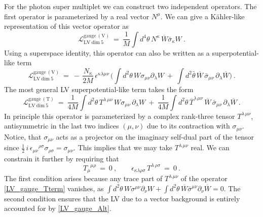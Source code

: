 \documentclass[12pt]{revtex4}
\begin{document}
For the photon super multiplet we can construct two independent
operators. The first operator is parameterized by a real vector
$N^\mu$. We can give a K\"ahler-like representation of this vector
operator as  
\begin{equation}
\label{LV_gauge}
\mathcal{L}_{\mathrm{LV\ dim\ 5}}^{\mathrm{gauge\ (V)}} ~=~ 
\frac 1M \int d^4\theta \, 
N^\kappa\, \overline{W} \bar{\sigma}_\kappa W~.   
\end{equation}
%
Using a superspace identity, this operator can also be written as a
superpotential-like term  
%
\begin{equation}
\label{LV_gauge_Alt}
\mathcal{L}_{\mathrm{LV\ dim\ 5}}^{\mathrm{gauge\ (V)}} ~=~ 
- \, \frac {N_\kappa}{2 M}\,  \epsilon^{\kappa\lambda\mu\nu} \,  
\Big( 
\int d^2\theta\, W \sigma_{\mu\nu} \partial_\lambda W ~+~
\int d^2\bar{\theta}\, \overline{W} \, \bar{\sigma}_{\mu\nu}\, 
\partial_\lambda \overline{W} 
\Big)~.
\end{equation} 
%
The most general LV superpotential-like term takes the form 
\begin{equation}
\label{LV_gauge_Tterm}
\mathcal{L}_{\mathrm{LV\ dim\ 5}}^{\mathrm{gauge\ (T)}} ~=~ 
\frac 1{4M} 
\int d^2\theta \, T^{\lambda\, \mu\nu} \,
        W \sigma_{\mu\nu} \, \partial_\lambda W  
~+~ \frac 1{4M} 
\int d^2\theta \, \overline{T}^{\lambda\, \mu\nu} \,
        \overline{W} \,\bar{\sigma}_{\mu\nu}\, \partial_\lambda\overline{W}  
~.
\end{equation}
%
In principle this operator is parameterized by a complex rank-three
tensor $T^{\lambda\,\mu\nu}$, antisymmetric in the last two indices
$(\mu,\nu)$ due to its contraction with $\sigma_{\mu\nu}$. Notice, that
$\sigma_{\mu\nu}$ acts as a projector on the imaginary self-dual part
of the tensor since 
\(
\frac{1}{2}\,i\,\epsilon_{\mu\nu}{}^{\rho\sigma}
\sigma_{\rho\sigma} = \sigma_{\mu\nu}. 
\)
This implies that we may take $T^{\lambda\,\mu\nu}$ real. We can
constrain it further by requiring that 
%
\begin{equation}
T_\mu^{\phantom{\mu}\mu\rho} ~=~ 0~,
 \qquad 
\epsilon_{\kappa\lambda\rho\sigma}\, T^{\lambda\,\rho\sigma}  ~=~  0~.
\end{equation} 
%
The first condition arises because any trace part of
$T^{\lambda\,\mu\nu}$ of the operator \eqref{LV_gauge_Tterm} 
vanishes, as 
\(
\int d^2\theta \, W\sigma^{\mu\nu} \partial_\nu W + 
\int d^2\theta \, \overline{W} \bar\sigma^{\mu\nu} \partial_\nu
\overline{W} = 0. 
\)
The second condition ensures that the LV due to a vector 
background is entirely accounted for by \eqref{LV_gauge_Alt}.
\end{document}
